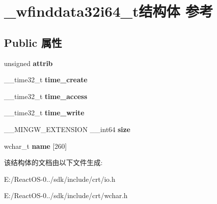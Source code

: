 \hypertarget{struct__wfinddata32i64__t}{}\section{\+\_\+wfinddata32i64\+\_\+t结构体 参考}
\label{struct__wfinddata32i64__t}
\subsection*{Public 属性}
\begin{DoxyCompactItemize}
\item 
\mbox{\label{struct__wfinddata32i64__t_ae379828f13ffd33294c57cbae8270d68}} 
unsigned {\bfseries attrib}
\item 
\mbox{\label{struct__wfinddata32i64__t_a0e8c0bfc6cf56afe637e3c7f38dad752}} 
\+\_\+\+\_\+time32\+\_\+t {\bfseries time\+\_\+create}
\item 
\mbox{\label{struct__wfinddata32i64__t_a790c5b35c348b465260694a5953e271a}} 
\+\_\+\+\_\+time32\+\_\+t {\bfseries time\+\_\+access}
\item 
\mbox{\label{struct__wfinddata32i64__t_a0134c1300fb56aa79802e02f915aed0c}} 
\+\_\+\+\_\+time32\+\_\+t {\bfseries time\+\_\+write}
\item 
\mbox{\label{struct__wfinddata32i64__t_a09d5d025fb7c1a547cacfffef524067b}} 
\+\_\+\+\_\+\+M\+I\+N\+G\+W\+\_\+\+E\+X\+T\+E\+N\+S\+I\+ON \+\_\+\+\_\+int64 {\bfseries size}
\item 
\mbox{\label{struct__wfinddata32i64__t_a30ae0d4f13a47c127bf94c9bb5ef64e5}} 
wchar\+\_\+t {\bfseries name} \mbox{[}260\mbox{]}
\end{DoxyCompactItemize}


该结构体的文档由以下文件生成\+:\begin{DoxyCompactItemize}
\item 
E\+:/\+React\+O\+S-\/0../sdk/include/crt/io.\+h\item 
E\+:/\+React\+O\+S-\/0../sdk/include/crt/wchar.\+h\end{DoxyCompactItemize}
